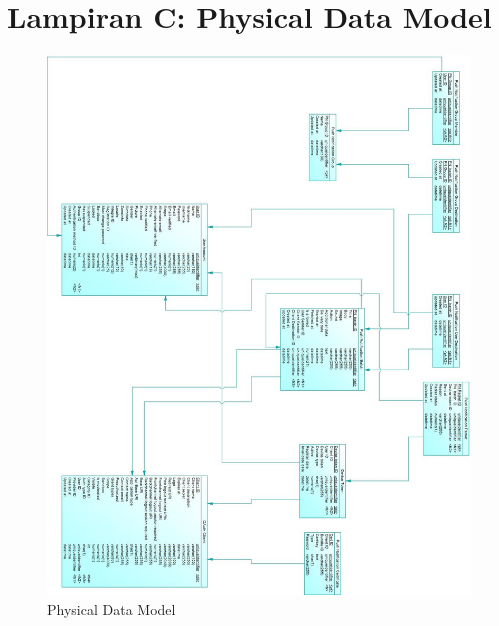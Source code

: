 \chapter{Lampiran C: Physical Data Model} \label{lampiran:pdm}
\begin{figure}[H]
	\centering\includegraphics[height=0.82\textheight]{penutup/lampiran/c/PDM.jpg}
	\caption{Physical Data Model}
\end{figure}
